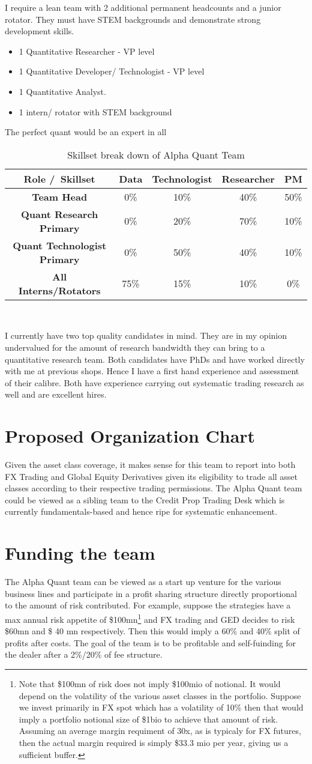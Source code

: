 \documentclass{article}
\newcommand{\SkillSpectrumTable}{
\begin{table}[ht]
\centering
\begin{tabular}{|c|c|c|c|c|}
\hline
\textbf{Role /\ Skillset} & \textbf{Data } & \textbf{Technologist} & \textbf{Researcher} & \textbf{PM} \\ 
\hline
\textbf{Team Head} & \cellcolor{red!60}0\% & \cellcolor{pink!60}10\% & \cellcolor{green!60}40\% & \cellcolor{green!60}50\% \\ 
\hline
\textbf{Quant Research Primary} & \cellcolor{red!60}0\% & \cellcolor{pink!60}20\% & \cellcolor{green!60}70\% & \cellcolor{pink!60}10\% \\ 
\hline
\textbf{Quant Technologist Primary} & \cellcolor{red!60}0\% & \cellcolor{green!60}50\% & \cellcolor{green!60}40\% & \cellcolor{pink!60}10\% \\ 
\hline
\textbf{All Interns/Rotators} & \cellcolor{green!60}75\% & \cellcolor{green!60}15\% & \cellcolor{pink!60}10\% & \cellcolor{red!60}0\% \\ 
\hline
\end{tabular}
\caption{Skillset break down of Alpha Quant Team}~\label{tb:skillset}
\end{table}

}
\begin{document}
I require a lean team with 2 additional permanent headcounts and a junior rotator. They must have STEM backgrounds and demonstrate strong development skills.
\begin{itemize}
\item 1 Quantitative Researcher - VP level
\item 1 Quantitative Developer/ Technologist - VP level
\item 1 Quantitative Analyst. 
\item 1 intern/ rotator with STEM background
\end{itemize}
The perfect quant would be an expert in all 
\SkillSpectrumTable

I currently have two top quality candidates in mind. They are in my opinion undervalued for the amount of research bandwidth they can bring to a quantitative research team. Both candidates have PhDs and have worked directly with me at previous shops. Hence I have a first hand experience and assessment of their calibre. Both have experience carrying out systematic trading research as well and are excellent hires.


\section{Proposed Organization Chart}
Given the asset class coverage, it makes sense for this team to report into both FX Trading and Global Equity Derivatives given its eligibility to trade all asset classes according to their respective trading permissions. The Alpha Quant team could be viewed as a sibling team to the Credit Prop Trading Desk which is currently fundamentals-based and hence ripe for systematic enhancement.

\section{Funding the team}
The Alpha Quant team can be viewed as a start up venture for the various business lines and participate in a profit sharing structure directly proportional to the amount of risk contributed. For example, suppose the strategies have a max annual risk appetite of \$100mn\footnote{Note that \$100mn of risk does not imply \$100mio of notional. It would depend on the volatility of the various asset classes in the portfolio. Suppose we invest primarily in FX spot which has a volatility of 10\% then that would imply a portfolio notional size of \$1bio to achieve that amount of risk. Assuming an average margin requiment of 30x, as is typicaly for FX futures, then the actual margin required is simply \$33.3 mio per year, giving us a sufficient buffer. } and FX trading and GED decides to risk \$60mn and \$ 40 mn respectively. Then this would imply a 60\% and  40\% split of profits after costs. The goal of the team is to be profitable and self-fuinding for the dealer after a 2\%/20\% of fee structure.
\end{document}
